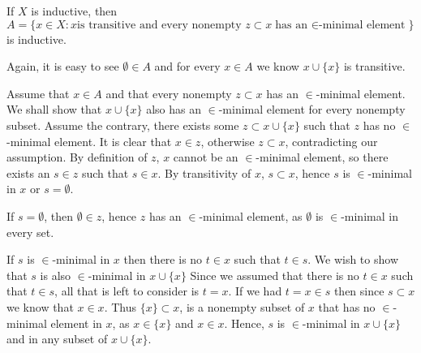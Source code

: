 \begin{problem}
  If $X$ is inductive, then $A = \{x \in X : x \text{is transitive and every nonempty } z \subset x \text{has an $\in$-minimal element}\}$ is inductive.
\end{problem}

\begin{solution}
  Again, it is easy to see $\emptyset \in A$ and for every $x \in A$ we know $x \cup \{x\}$ is transitive.

  Assume that $x \in A$ and that every nonempty $z \subset x$ has an $\in$-minimal element.
  We shall show that $x \cup \{x\}$ also has an $\in$-minimal element for every nonempty subset.
  Assume the contrary, there exists some $z \subset x \cup \{x\}$ such that $z$ has no $\in$-minimal element.
  It is clear that $x \in z$, otherwise $z \subset x$, contradicting our assumption.
  By definition of $z$, $x$ cannot be an $\in$-minimal element, so there exists an $s \in z$ such that $s \in x$.
  By transitivity of $x$, $s \subset x$, hence $s$ is $\in$-minimal in $x$ or $s = \emptyset$.

  If $s = \emptyset$, then $\emptyset \in z$, hence $z$ has an $\in$-minimal element, as $\emptyset$ is $\in$-minimal in every set.

  If $s$ is $\in$-minimal in $x$ then there is no $t \in x$ such that $t \in s$.
  We wish to show that $s$ is also $\in$-minimal in $x \cup \{x\}$
  Since we assumed that there is no $t \in x$ such that $t \in s$, all that is left to consider is $t = x$.
  If we had $t = x \in s$ then since $s \subset x$ we know that $x \in x$.
  Thus $\{x\} \subset x$, is a nonempty subset of $x$ that has no $\in$-minimal element in $x$, as $x \in \{x\}$ and $x \in x$.
  Hence, $s$ is $\in$-minimal in $x \cup \{x\}$ and in any subset of $x \cup \{x\}$.
\end{solution}

